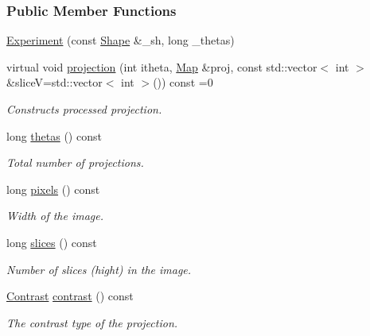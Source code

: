 \subsubsection*{Public Member Functions}
\begin{DoxyCompactItemize}
\item 
\hyperlink{classExperiment_a95f36b2bdd0800251a226565a26ee695}{Experiment} (const \hyperlink{group__Types_ga777964671cb4315ce8c56c920db031e3}{Shape} \&\_\-sh, long \_\-thetas)
\item 
virtual void \hyperlink{classExperiment_a154d68b031d0e181295ee2adbd66d8c3}{projection} (int itheta, \hyperlink{group__Types_ga8747378c016fc11d9ecbb98787248c25}{Map} \&proj, const std::vector$<$ int $>$ \&sliceV=std::vector$<$ int $>$()) const =0
\begin{DoxyCompactList}\small\item\em Constructs processed projection. \item\end{DoxyCompactList}\item 
long \hyperlink{classExperiment_a9f0ae164ca27059b854adc8e72f0e66c}{thetas} () const 
\begin{DoxyCompactList}\small\item\em Total number of projections. \item\end{DoxyCompactList}\item 
long \hyperlink{classExperiment_aad4d70c42b47f05258f3809bcec72a42}{pixels} () const 
\begin{DoxyCompactList}\small\item\em Width of the image. \item\end{DoxyCompactList}\item 
long \hyperlink{classExperiment_a716ab0c38e5db32663b7b5ff7b22d5af}{slices} () const 
\begin{DoxyCompactList}\small\item\em Number of slices (hight) in the image. \item\end{DoxyCompactList}\item 
\hyperlink{classContrast}{Contrast} \hyperlink{classExperiment_a60b1d786610409f7e35dbb4e8cc297ea}{contrast} () const 
\begin{DoxyCompactList}\small\item\em The contrast type of the projection. \item\end{DoxyCompactList}\end{DoxyCompactItemize}
